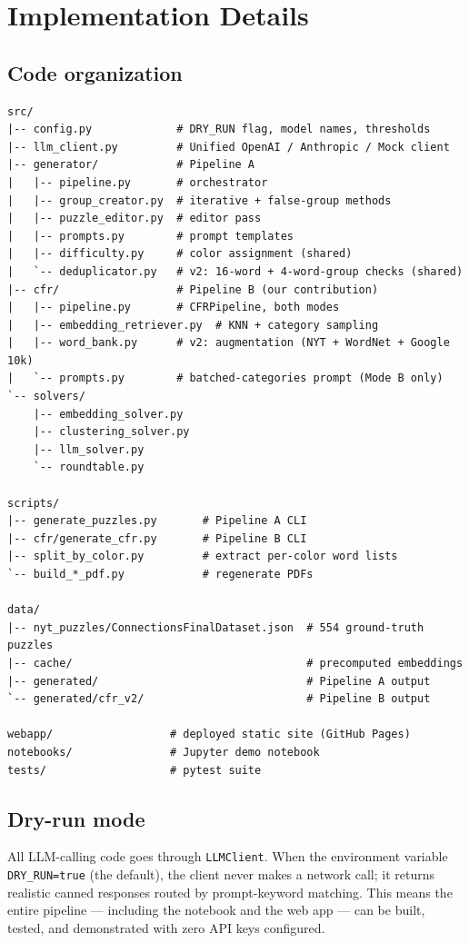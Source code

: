 \documentclass[11pt, letterpaper]{article}
\begin{document}
\section{Implementation Details}

\subsection{Code organization}

\begin{lstlisting}[language=text]
src/
|-- config.py             # DRY_RUN flag, model names, thresholds
|-- llm_client.py         # Unified OpenAI / Anthropic / Mock client
|-- generator/            # Pipeline A
|   |-- pipeline.py       # orchestrator
|   |-- group_creator.py  # iterative + false-group methods
|   |-- puzzle_editor.py  # editor pass
|   |-- prompts.py        # prompt templates
|   |-- difficulty.py     # color assignment (shared)
|   `-- deduplicator.py   # v2: 16-word + 4-word-group checks (shared)
|-- cfr/                  # Pipeline B (our contribution)
|   |-- pipeline.py       # CFRPipeline, both modes
|   |-- embedding_retriever.py  # KNN + category sampling
|   |-- word_bank.py      # v2: augmentation (NYT + WordNet + Google 10k)
|   `-- prompts.py        # batched-categories prompt (Mode B only)
`-- solvers/
    |-- embedding_solver.py
    |-- clustering_solver.py
    |-- llm_solver.py
    `-- roundtable.py

scripts/
|-- generate_puzzles.py       # Pipeline A CLI
|-- cfr/generate_cfr.py       # Pipeline B CLI
|-- split_by_color.py         # extract per-color word lists
`-- build_*_pdf.py            # regenerate PDFs

data/
|-- nyt_puzzles/ConnectionsFinalDataset.json  # 554 ground-truth puzzles
|-- cache/                                    # precomputed embeddings
|-- generated/                                # Pipeline A output
`-- generated/cfr_v2/                         # Pipeline B output

webapp/                  # deployed static site (GitHub Pages)
notebooks/               # Jupyter demo notebook
tests/                   # pytest suite
\end{lstlisting}

\subsection{Dry-run mode}
All LLM-calling code goes through \texttt{LLMClient}. When the environment
variable \texttt{DRY\_RUN=true} (the default), the client never makes a network
call; it returns realistic canned responses routed by prompt-keyword matching.
This means the entire pipeline --- including the notebook and the web app ---
can be built, tested, and demonstrated with zero API keys configured.
\end{document}
